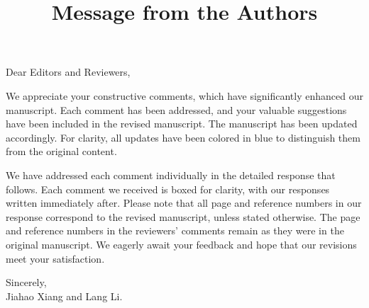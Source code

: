 \title{Message from the Authors}
\vskip 0.2in

\noindent Dear Editors and Reviewers,

\vskip 0.1in

\noindent We appreciate your constructive comments, which have significantly enhanced our manuscript. Each comment has been addressed, and your valuable suggestions have been included in the revised manuscript. The manuscript has been updated accordingly. For clarity, all updates have been colored in blue to distinguish them from the original content.

\noindent We have addressed each comment individually in the detailed response that follows. Each comment we received is boxed for clarity, with our responses written immediately after. Please note that all page and reference numbers in our response correspond to the revised manuscript, unless stated otherwise. The page and reference numbers in the reviewers' comments remain as they were in the original manuscript. We eagerly await your feedback and hope that our revisions meet your satisfaction.
\vskip 0.2in

\noindent Sincerely, \\
\noindent Jiahao Xiang and Lang Li.

